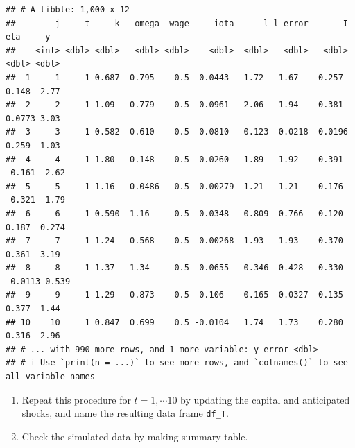 \documentclass[
]{book}
\begin{document}
\begin{verbatim}
## # A tibble: 1,000 x 12
##        j     t     k   omega  wage     iota      l l_error       I     eta     y
##    <int> <dbl> <dbl>   <dbl> <dbl>    <dbl>  <dbl>   <dbl>   <dbl>   <dbl> <dbl>
##  1     1     1 0.687  0.795    0.5 -0.0443   1.72   1.67    0.257   0.148  2.77 
##  2     2     1 1.09   0.779    0.5 -0.0961   2.06   1.94    0.381   0.0773 3.03 
##  3     3     1 0.582 -0.610    0.5  0.0810  -0.123 -0.0218 -0.0196  0.259  1.03 
##  4     4     1 1.80   0.148    0.5  0.0260   1.89   1.92    0.391  -0.161  2.62 
##  5     5     1 1.16   0.0486   0.5 -0.00279  1.21   1.21    0.176  -0.321  1.79 
##  6     6     1 0.590 -1.16     0.5  0.0348  -0.809 -0.766  -0.120   0.187  0.274
##  7     7     1 1.24   0.568    0.5  0.00268  1.93   1.93    0.370   0.361  3.19 
##  8     8     1 1.37  -1.34     0.5 -0.0655  -0.346 -0.428  -0.330  -0.0113 0.539
##  9     9     1 1.29  -0.873    0.5 -0.106    0.165  0.0327 -0.135   0.377  1.44 
## 10    10     1 0.847  0.699    0.5 -0.0104   1.74   1.73    0.280   0.316  2.96 
## # ... with 990 more rows, and 1 more variable: y_error <dbl>
## # i Use `print(n = ...)` to see more rows, and `colnames()` to see all variable names
\end{verbatim}

\begin{enumerate}
\def\labelenumi{\arabic{enumi}.}
\setcounter{enumi}{8}
\item
  Repeat this procedure for \(t = 1, \cdots 10\) by updating the capital and anticipated shocks, and name the resulting data frame \texttt{df\_T}.
\item
  Check the simulated data by making summary table.
\end{enumerate}
\end{document}
